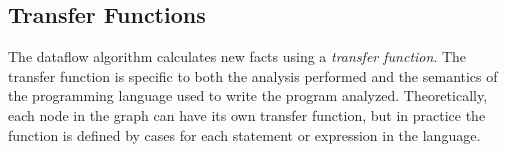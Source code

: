 \documentclass[12pt]{report}
\begin{document}







\subsection{Transfer Functions}
\label{back_subsec_transfer}

The dataflow algorithm calculates new facts using a \emph{transfer
  function}. The transfer function is specific to both the analysis
performed and the semantics of the programming language used to write
the program analyzed. Theoretically, each node in the graph can
have its own transfer function, but in practice the function is 
defined by cases for each statement or expression in the language. 
\end{document}

